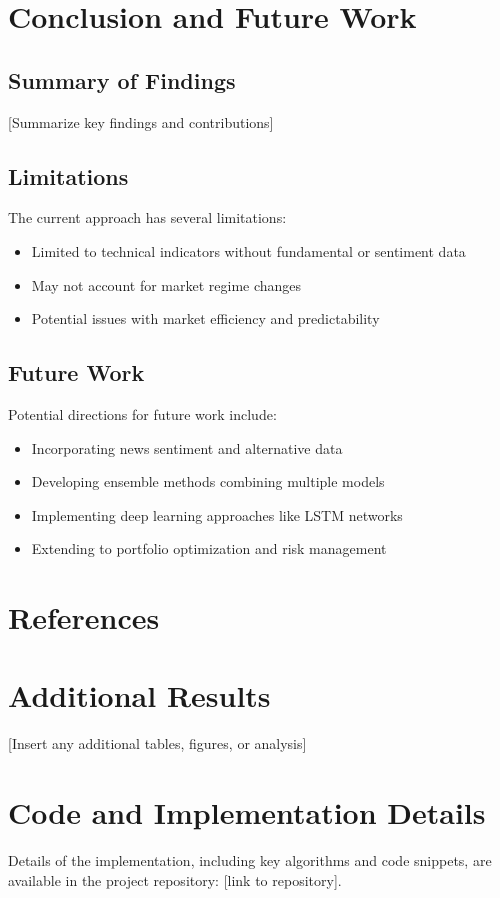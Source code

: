 \documentclass[12pt,a4paper]{article}
\begin{document}
\section{Conclusion and Future Work}
\subsection{Summary of Findings}
[Summarize key findings and contributions]

\subsection{Limitations}
The current approach has several limitations:
\begin{itemize}
    \item Limited to technical indicators without fundamental or sentiment data
    \item May not account for market regime changes
    \item Potential issues with market efficiency and predictability
\end{itemize}

\subsection{Future Work}
Potential directions for future work include:
\begin{itemize}
    \item Incorporating news sentiment and alternative data
    \item Developing ensemble methods combining multiple models
    \item Implementing deep learning approaches like LSTM networks
    \item Extending to portfolio optimization and risk management
\end{itemize}

\section{References}



\appendix
\section{Additional Results}
[Insert any additional tables, figures, or analysis]

\section{Code and Implementation Details}
Details of the implementation, including key algorithms and code snippets, are available in the project repository: [link to repository].
\end{document}
